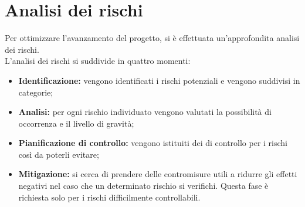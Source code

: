 \section{Analisi dei rischi}
Per ottimizzare l'avanzamento del progetto, si è effettuata un'approfondita analisi dei
rischi. \\
L'analisi dei rischi si suddivide in quattro momenti: \\
\begin{itemize}
	\item \textbf{Identificazione:} vengono identificati i rischi potenziali e vengono suddivisi in categorie;
	\item \textbf{Analisi:} per ogni rischio individuato vengono valutati la possibilità di occorrenza e il livello di gravità;
	\item \textbf{Pianificazione di controllo:} vengono istituiti dei  di controllo per i rischi così da poterli evitare;
	\item \textbf{Mitigazione:} si cerca di prendere delle contromisure utili a ridurre gli effetti negativi nel caso che un determinato rischio si verifichi. Questa fase è richiesta solo per i rischi difficilmente controllabili. \\
\end{itemize}
\def\arraystretch{1.5}
